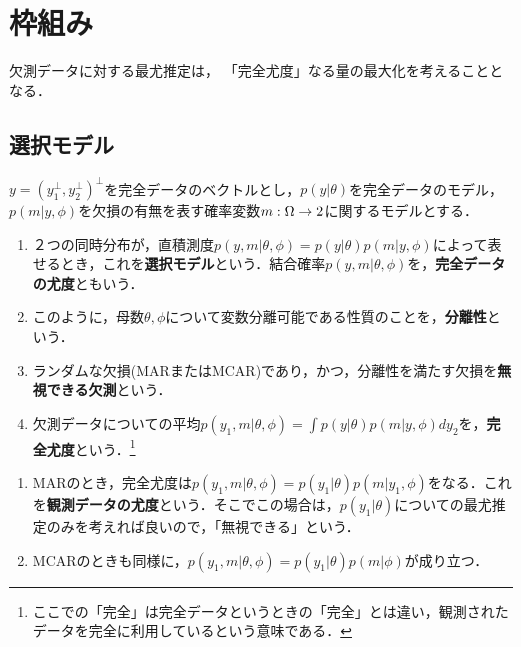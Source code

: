 \documentclass[uplatex,dvipdfmx]{jsreport}
\begin{document}
\section{枠組み}

\begin{tcolorbox}[colframe=ForestGreen, colback=ForestGreen!10!white,breakable,colbacktitle=ForestGreen!40!white,coltitle=black,fonttitle=\bfseries\sffamily,
title=]
    欠測データに対する最尤推定は，
    「完全尤度」なる量の最大化を考えることとなる．
\end{tcolorbox}

\subsection{選択モデル}

\begin{definition}
    $y=(y_1^\perp,y^\perp_2)^\perp$を完全データのベクトルとし，$p(y|\theta)$を完全データのモデル，$p(m|y,\phi)$を欠損の有無を表す確率変数$m:\Omega\to2$に関するモデルとする．
    \begin{enumerate}
        \item ２つの同時分布が，直積測度$p(y,m|\theta,\phi)=p(y|\theta)p(m|y,\phi)$によって表せるとき，これを\textbf{選択モデル}という．結合確率$p(y,m|\theta,\phi)$を，\textbf{完全データの尤度}ともいう．
        \item このように，母数$\theta,\phi$について変数分離可能である性質のことを，\textbf{分離性}という．
        \item ランダムな欠損(MARまたはMCAR)であり，かつ，分離性を満たす欠損を\textbf{無視できる欠測}という．
        \item 欠測データについての平均$p(y_1,m|\theta,\phi)=\int p(y|\theta)p(m|y,\phi)dy_2$を，\textbf{完全尤度}という．\footnote{ここでの「完全」は完全データというときの「完全」とは違い，観測されたデータを完全に利用しているという意味である．}
    \end{enumerate}
\end{definition}
\begin{remark}[無視できる欠測について]\mbox{}
    \begin{enumerate}
        \item MARのとき，完全尤度は$p(y_1,m|\theta,\phi)=p(y_1|\theta)p(m|y_1,\phi)$をなる．これを\textbf{観測データの尤度}という．そこでこの場合は，$p(y_1|\theta)$についての最尤推定のみを考えれば良いので，「無視できる」という．
        \item MCARのときも同様に，$p(y_1,m|\theta,\phi)=p(y_1|\theta)p(m|\phi)$が成り立つ．
    \end{enumerate}
\end{remark}
\end{document}
